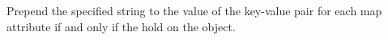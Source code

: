 Prepend the specified string to the value of the key-value pair for each map
attribute if and only if the  hold on the object.



